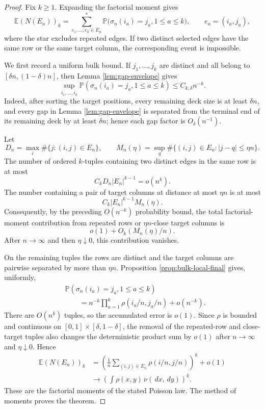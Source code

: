 \documentclass[11pt]{article}
\theoremstyle{remark}
\newcommand{\Pp}{\mathbb P}
\newcommand{\Ee}{\mathbb E}
\newcommand{\dd}{\,d}
\begin{document}
\begin{proof}
Fix $k\ge1$.  Expanding the factorial moment gives
\[        \Ee(N(E_n))_k
        =\sum_{e_1,\ldots,e_k\in E_n}^{*}
        \Pp\bigl(\sigma_n(i_a)=j_a,
        1\le a\le k\bigr),
        \qquad e_a=(i_a,j_a),
\]
where the star excludes repeated edges.  If two distinct selected edges have the
same row or the same target column, the corresponding event is impossible.

We first record a uniform bulk bound.  If $j_1,\ldots,j_k$ are distinct and all
belong to $[\delta n,(1-\delta)n]$, then Lemma
\ref{lem:gap-envelope} gives
\[
        \sup_{i_1,\ldots,i_k}
        \Pp(\sigma_n(i_a)=j_a,1\le a\le k)
        \le C_{k,\delta}n^{-k}.
\]
Indeed, after sorting the target positions, every remaining deck size is at
least $\delta n$, and every gap in Lemma \ref{lem:gap-envelope} is separated
from the terminal end of its remaining deck by at least $\delta n$; hence each
gap factor is $O_\delta(n^{-1})$.

Let
\[
        D_n=\max_i\#\{j:(i,j)\in E_n\},
        \qquad
        M_n(\eta)=\sup_q
        \#\{(i,j)\in E_n:|j-q|\le\eta n\}.
\]
The number of ordered $k$-tuples containing two distinct edges in the same row
is at most
\[
        C_k D_n|E_n|^{k-1}=o(n^k).
\]
The number containing a pair of target columns at distance at most $\eta n$ is
at most
\[
        C_k |E_n|^{k-1}M_n(\eta).
\]
Consequently, by the preceding $O(n^{-k})$ probability bound, the total
factorial-moment contribution from repeated rows or $\eta n$-close target
columns is
\[
        o(1)+O_k(M_n(\eta)/n).
\]
After $n\to\infty$ and then $\eta\downarrow0$, this contribution vanishes.

On the remaining tuples the rows are distinct and the target columns are
pairwise separated by more than $\eta n$.  Proposition
\ref{prop:bulk-local-final} gives, uniformly,
\[
\begin{aligned}
        &\Pp(\sigma_n(i_a)=j_a,1\le a\le k)\\
        &\qquad=n^{-k}\prod_{a=1}^k
        \rho(i_a/n,j_a/n)+o(n^{-k}).
\end{aligned}
\]
There are $O(n^k)$ tuples, so the accumulated error is $o(1)$.  Since $\rho$ is
bounded and continuous on $[0,1]\times[\delta,1-\delta]$, the removal of the
repeated-row and close-target tuples also changes the deterministic product sum
by $o(1)$ after $n\to\infty$ and $\eta\downarrow0$.  Hence
\[
\begin{aligned}
        \Ee(N(E_n))_k
        &=\left(\frac1n\sum_{(i,j)\in E_n}
        \rho(i/n,j/n)\right)^k+o(1)\\
        &\longrightarrow
        \left(\int\rho(x,y)\,\nu(\dd x,\dd y)\right)^k.
\end{aligned}
\]
These are the factorial moments of the stated Poisson law.  The method of
moments proves the theorem.
\end{proof}
\end{document}
